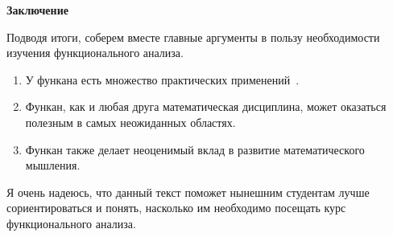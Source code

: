 \documentclass[russian]{article}
\begin{document}
\textbf{Заключение}

Подводя итоги, соберем вместе главные аргументы в пользу необходимости изучения функционального анализа.

\begin{enumerate}
  \item У функана есть множество практических применений~\cite{quantum,kollats,prob}.
  \item Функан, как и любая друга математическая дисциплина, может оказаться полезным в самых неожиданных областях.
  \item Функан также делает неоценимый вклад в развитие математического мышления.
\end{enumerate}

Я очень надеюсь, что данный текст поможет нынешним студентам лучше сориентироваться и понять, насколько им необходимо посещать курс функционального анализа.



\end{document}
